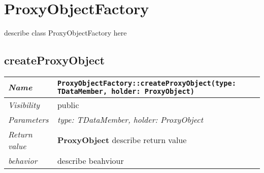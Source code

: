 \chapter{ProxyObjectFactory}
describe class ProxyObjectFactory here
\section{createProxyObject}
\begin{longtable}{p{3cm} @{\hskip 1cm} p{12cm}}
 \hline
\textit{Name} & \texttt{ProxyObjectFactory::createProxyObject(type: TDataMember, holder: ProxyObject)}\\
\hline
 \textit{Visibility} & public\\
\hline
\textit{Parameters} & \textit{type: TDataMember, holder: ProxyObject}\\
\hline
\textit{Return value} & \textbf{ ProxyObject} describe return value\\
  \hline
 \textit{behavior} & describe beahviour \\
\hline
\end{longtable} \pagebreak
 